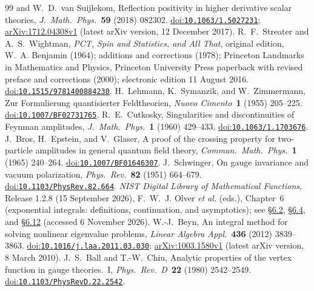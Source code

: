 \documentclass[final,5p,times,twocolumn,numbers,nopreprintline]{elsarticle}
\numberwithin{equation}{section}
\theoremstyle{definition}
\theoremstyle{remark}
\begin{document}
\begin{thebibliography}{99}
and W.~D.~van Suijlekom,
Reflection positivity in higher derivative scalar theories,
\emph{J.\ Math.\ Phys.}\ \textbf{59} (2018) 082302.
\href{https://doi.org/10.1063/1.5027231}{doi:\nolinkurl{10.1063/1.5027231}};
\href{https://arxiv.org/abs/1712.04308v1}{arXiv:1712.04308v1}
(latest arXiv version, 12 December 2017).
R.~F.~Streater and A.~S.~Wightman,
\emph{PCT, Spin and Statistics, and All That},
original edition, W.~A. Benjamin (1964); additions and corrections
(1978); Princeton Landmarks in Mathematics and Physics,
Princeton University Press paperback with revised preface and
corrections (2000); electronic edition 11 August 2016.
\href{https://doi.org/10.1515/9781400884230}{doi:\nolinkurl{10.1515/9781400884230}}.
H.~Lehmann, K.~Symanzik, and W.~Zimmermann,
Zur Formulierung quantisierter Feldtheorien,
\emph{Nuovo Cimento}\ \textbf{1} (1955) 205--225.
\href{https://doi.org/10.1007/BF02731765}{doi:\nolinkurl{10.1007/BF02731765}}.
R.~E.~Cutkosky,
Singularities and discontinuities of Feynman amplitudes,
\emph{J.\ Math.\ Phys.}\ \textbf{1} (1960) 429--433.
\href{https://doi.org/10.1063/1.1703676}{doi:\nolinkurl{10.1063/1.1703676}}.
J.~Bros, H.~Epstein, and V.~Glaser,
A proof of the crossing property for two-particle amplitudes in
general quantum field theory,
\emph{Commun.\ Math.\ Phys.}\ \textbf{1} (1965) 240--264.
\href{https://doi.org/10.1007/BF01646307}{doi:\nolinkurl{10.1007/BF01646307}}.
J.~Schwinger,
On gauge invariance and vacuum polarization,
\emph{Phys.\ Rev.}\ \textbf{82} (1951) 664--679.
\href{https://doi.org/10.1103/PhysRev.82.664}{doi:\nolinkurl{10.1103/PhysRev.82.664}}.
\emph{NIST Digital Library of Mathematical Functions},
Release 1.2.8 (15 September 2026), F.~W.~J. Olver \emph{et al.} (eds.),
Chapter~6 (exponential integrals: definitions, continuation,
and asymptotics); see
\href{https://dlmf.nist.gov/6.2}{\S6.2},
\href{https://dlmf.nist.gov/6.4}{\S6.4},
and \href{https://dlmf.nist.gov/6.12}{\S6.12}
(accessed 6 November 2026).
W.-J.~Beyn,
An integral method for solving nonlinear eigenvalue problems,
\emph{Linear Algebra Appl.}\ \textbf{436} (2012) 3839--3863.
\href{https://doi.org/10.1016/j.laa.2011.03.030}{doi:\nolinkurl{10.1016/j.laa.2011.03.030}};
\href{https://arxiv.org/abs/1003.1580v1}{arXiv:1003.1580v1}
(latest arXiv version, 8 March 2010).
J.~S.~Ball and T.-W.~Chiu,
Analytic properties of the vertex function in gauge theories.~I,
\emph{Phys.\ Rev.\ D}\ \textbf{22} (1980) 2542--2549.
\href{https://doi.org/10.1103/PhysRevD.22.2542}{doi:\nolinkurl{10.1103/PhysRevD.22.2542}}.
\end{thebibliography}
\endgroup
\end{document}
